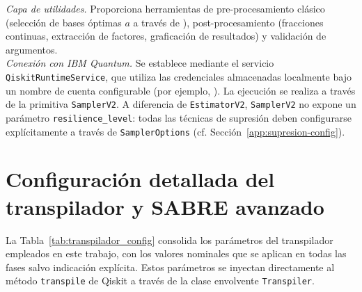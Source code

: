 \documentclass[12pt, spanish]{book}
\begin{document}
\textit{Capa de utilidades.} Proporciona herramientas de pre-procesamiento clásico (selección de bases óptimas $a$ a través de ), post-procesamiento (fracciones continuas, extracción de factores, graficación de resultados) y validación de argumentos.\\

\textit{Conexión con IBM Quantum.} Se establece mediante el servicio \texttt{QiskitRuntimeSer\-vice}, que utiliza las credenciales almacenadas localmente bajo un nombre de cuenta configurable (por ejemplo, ). La ejecución se realiza a través de la primitiva \texttt{SamplerV2}. A diferencia de \texttt{EstimatorV2}, \texttt{SamplerV2} no expone un parámetro \texttt{resilience\_level}: todas las técnicas de supresión deben configurarse explícitamente a través de \texttt{SamplerOptions} (cf. Sección~\ref{app:supresion-config}).

\section{Configuración detallada del transpilador y SABRE avanzado}
\label{app:sabre-avanzado}

La Tabla~\ref{tab:transpilador_config} consolida los parámetros del transpilador empleados en este trabajo, con los valores nominales que se aplican en todas las fases salvo indicación explícita. Estos parámetros se inyectan directamente al método \texttt{transpile} de Qiskit a través de la clase envolvente \texttt{Transpiler}.

\newpage
\end{document}
